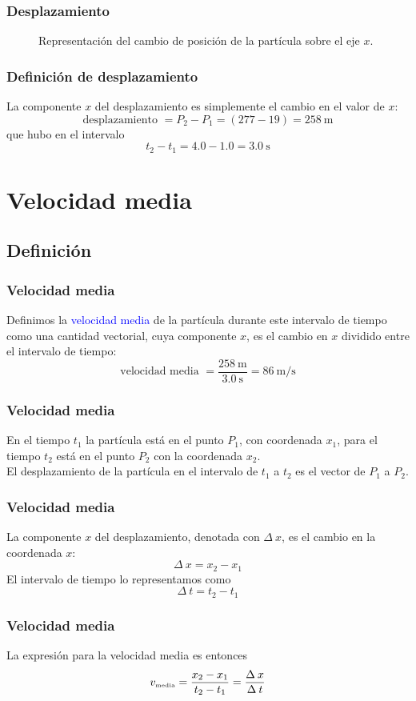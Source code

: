 \begin{frame}
\frametitle{Desplazamiento}
\begin{figure}
    \centering
    
    \caption{Representación del cambio de posición de la partícula sobre el eje $x$.}
\end{figure}
\end{frame}
\begin{frame}
\frametitle{Definición de desplazamiento}
La componente $x$ del desplazamiento es simplemente el cambio en el valor de $x$:
\[ \mbox{desplazamiento } = P_{2}  - P_{1} = (277 - 19) = \SI{258}{\meter} \]
que hubo en el intervalo
\[ t_{2} - t_{1}  = 4.0 - 1.0 = \SI{3.0}{\second} \]
\end{frame}
\section{Velocidad media}
\subsection{Definición}
\begin{frame}
\frametitle{Velocidad media}
Definimos la \textcolor{blue}{velocidad media} de la partícula  durante este intervalo de tiempo como una cantidad vectorial, cuya componente $x$, es el cambio en $x$ dividido entre el intervalo de tiempo:
\[ \mbox{velocidad media } = \dfrac{\SI{258}{\meter}}{\SI{3.0}{\second}} = \SI[per-mode=fraction]{86}{\meter\per\second}  \] 
\end{frame}
\begin{frame}
\frametitle{Velocidad media}
En el tiempo $t_{1}$ la partícula está en el punto $P_{1}$, con  coordenada $x_{1}$, para el tiempo $t_{2}$ está en el punto $P_{2}$ con la coordenada $x_{2}$.
\\
\bigskip
\pause
El desplazamiento de la partícula en el intervalo de $t_{1}$ a $t_{2}$ es el vector de $P_{1}$ a $P_{2}$.
\end{frame}
\begin{frame}
\frametitle{Velocidad media}
La componente $x$ del desplazamiento, denotada con $\Delta \: x$, es el cambio en la coordenada $x$:
\[  \Delta \: x = x_{2} - x_{1} \]
\pause
El intervalo de tiempo lo representamos como
\[ \Delta \: t = t_{2} - t_{1} \]
\end{frame}
\begin{frame}
\frametitle{Velocidad media}
La expresión para la velocidad media es entonces
\[ v_{\mbox{\tiny{media}}} = \dfrac{x_{2} - x_{1}}{t_{2} - t_{1}} = \dfrac{\Delta \: x}{\Delta \: t}  \]
\end{frame}
